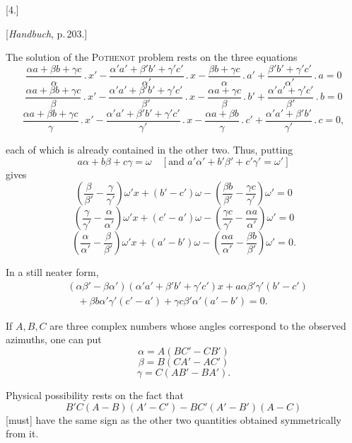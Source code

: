 
\begin{center}
[4.]

[\emph{Handbuch}, p.\,203.]
\end{center}

The solution of the \textsc{Pothenot} problem rests on the three equations
\[
\frac{\alpha a+\beta b+\gamma c}{\alpha}\, . \, x' - \frac{\alpha' a'+\beta' b'+\gamma' c'}{\alpha'}\, . \, x - \frac{\beta b+\gamma c}{\alpha}\, . \, a' + \frac{\beta' b'+\gamma' c'}{\alpha'}\, . \, a = 0
\]
\[
\frac{\alpha a+\beta b+\gamma c}{\beta}\, . \, x' - \frac{\alpha' a'+\beta' b'+\gamma' c'}{\beta'}\, . \, x - \frac{\alpha a+\gamma c}{\beta}\, . \, b' + \frac{\alpha' a'+\gamma' c'}{\beta'}\, . \, b = 0
\]
\[
\frac{\alpha a+\beta b+\gamma c}{\gamma}\, . \, x' - \frac{\alpha' a'+\beta' b'+\gamma' c'}{\gamma'}\, . \, x - \frac{\alpha a+\beta b}{\gamma}\, . \, c' + \frac{\alpha' a'+\beta' b'}{\gamma'}\, . \, c = 0,
\]

each of which is already contained in the other two. Thus, putting
\[
a\alpha+b\beta+c\gamma=\omega \quad [\text{and } a'\alpha'+b'\beta'+c'\gamma'=\omega']
\]
gives
\[
\left(\frac{\beta}{\beta'}-\frac{\gamma}{\gamma'}\right)\omega' x + (b'-c')\omega - \left(\frac{\beta b}{\beta'}-\frac{\gamma c}{\gamma'}\right)\omega' = 0
\]
\[
\left(\frac{\gamma}{\gamma'}-\frac{\alpha}{\alpha'}\right)\omega' x + (c'-a')\omega - \left(\frac{\gamma c}{\gamma'}-\frac{\alpha a}{\alpha'}\right)\omega' = 0
\]
\[
\left(\frac{\alpha}{\alpha'}-\frac{\beta}{\beta'}\right)\omega' x + (a'-b')\omega - \left(\frac{\alpha a}{\alpha'}-\frac{\beta b}{\beta'}\right)\omega' = 0.
\]

In a still neater form,
\[
\begin{aligned}
&(\alpha\beta'-\beta\alpha')(\alpha' a'+\beta' b'+\gamma' c')x + a\alpha\beta'\gamma'(b'-c')\\
&\quad+ \beta b\alpha'\gamma'(c'-a') + \gamma c\beta'\alpha'(a'-b') = 0.
\end{aligned}
\]

\medskip

If $A, B, C$ are three complex numbers whose angles correspond to the observed azimuths, one can put
\[
\alpha = A(BC'-CB')
\]
\[
\beta = B(CA'-AC')
\]
\[
\gamma = C(AB'-BA').
\]

Physical possibility rests on the fact that
\[
B'C(A-B)(A'-C') - BC'(A'-B')(A-C)
\]
[must] have the same sign as the other two quantities obtained symmetrically from it.
